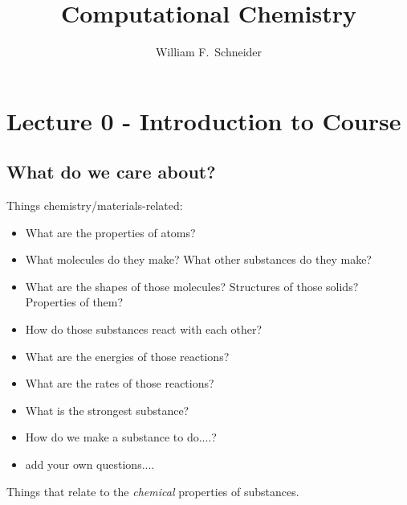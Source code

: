 \documentclass[12pt]{article}
\title{Computational Chemistry}
\author{William F.\ Schneider}
\begin{document}
\maketitle



\section{Lecture 0 - Introduction to Course}
\subsection{What do we care about?}
Things chemistry/materials-related:

\begin{itemize}{}{}
\item What are the properties of atoms?
\item What molecules do they make?  What other substances do they make?
\item What are the shapes of those molecules?  Structures of those
  solids?  Properties of them?
\item How do those substances react with each other?
\item What are the energies of those reactions?
\item What are the rates of those reactions?
\item What is the strongest substance?
\item How do we make a substance to do....?
\item add your own questions....
\end{itemize}

Things that relate to the {\em chemical} properties of substances.
\end{document}
